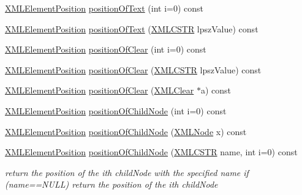 \begin{DoxyCompactItemize}
\hyperlink{xmlParser_8h_aab10d65aadeca1f026f6416becde7432}{X\-M\-L\-Element\-Position} \hyperlink{group__xmlPosition_ga4376524698201e37c805bfa37945a600}{position\-Of\-Text} (int i=0) const 
\item 
\hyperlink{xmlParser_8h_aab10d65aadeca1f026f6416becde7432}{X\-M\-L\-Element\-Position} \hyperlink{group__xmlPosition_ga3a590db071ce9f3fdc6e82405ab8507d}{position\-Of\-Text} (\hyperlink{xmlParser_8h_acdb0d6fd8dd596384b438d86cfb2b182}{X\-M\-L\-C\-S\-T\-R} lpsz\-Value) const 
\item 
\hyperlink{xmlParser_8h_aab10d65aadeca1f026f6416becde7432}{X\-M\-L\-Element\-Position} \hyperlink{group__xmlPosition_gafbeb4c6fcb5f164a4e5501d048c0f714}{position\-Of\-Clear} (int i=0) const 
\item 
\hyperlink{xmlParser_8h_aab10d65aadeca1f026f6416becde7432}{X\-M\-L\-Element\-Position} \hyperlink{group__xmlPosition_gaae9a760878f7e2d8e392b17edb00ea19}{position\-Of\-Clear} (\hyperlink{xmlParser_8h_acdb0d6fd8dd596384b438d86cfb2b182}{X\-M\-L\-C\-S\-T\-R} lpsz\-Value) const 
\item 
\hyperlink{xmlParser_8h_aab10d65aadeca1f026f6416becde7432}{X\-M\-L\-Element\-Position} \hyperlink{group__xmlPosition_ga917818941aa305d3829472d49f33a4b5}{position\-Of\-Clear} (\hyperlink{structXMLClear}{X\-M\-L\-Clear} $\ast$a) const 
\item 
\hyperlink{xmlParser_8h_aab10d65aadeca1f026f6416becde7432}{X\-M\-L\-Element\-Position} \hyperlink{group__xmlPosition_gac98af1de6ed1218e5d26f7e509b8678f}{position\-Of\-Child\-Node} (int i=0) const 
\item 
\hyperlink{xmlParser_8h_aab10d65aadeca1f026f6416becde7432}{X\-M\-L\-Element\-Position} \hyperlink{group__xmlPosition_gaf8457366bc393a57e33896e46592cb3e}{position\-Of\-Child\-Node} (\hyperlink{structXMLNode}{X\-M\-L\-Node} x) const 
\item 
\hyperlink{xmlParser_8h_aab10d65aadeca1f026f6416becde7432}{X\-M\-L\-Element\-Position} \hyperlink{group__xmlPosition_ga102dcd93d13144e2a87b664e6f810725}{position\-Of\-Child\-Node} (\hyperlink{xmlParser_8h_acdb0d6fd8dd596384b438d86cfb2b182}{X\-M\-L\-C\-S\-T\-R} name, int i=0) const 
\begin{DoxyCompactList}\small\item\em return the position of the ith child\-Node with the specified name if (name==N\-U\-L\-L) return the position of the ith child\-Node \end{DoxyCompactList}\end{DoxyCompactItemize}
